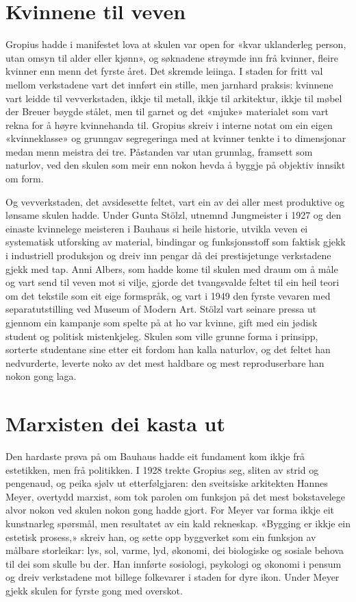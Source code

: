 \section{Kvinnene til veven}

Gropius hadde i manifestet lova at skulen var open for «kvar uklanderleg person, utan omsyn til alder eller kjønn», og søknadene strøymde inn frå kvinner, fleire kvinner enn menn det fyrste året. Det skremde leiinga. I staden for fritt val mellom verkstadene vart det innført ein stille, men jarnhard praksis: kvinnene vart leidde til vevverkstaden, ikkje til metall, ikkje til arkitektur, ikkje til møbel der Breuer bøygde stålet, men til garnet og det «mjuke» materialet som vart rekna for å høyre kvinnehanda til. Gropius skreiv i interne notat om ein eigen «kvinneklasse» og grunngav segregeringa med at kvinner tenkte i to dimensjonar medan menn meistra dei tre. Påstanden var utan grunnlag, framsett som naturlov, ved den skulen som meir enn nokon hevda å byggje på objektiv innsikt om form.

Og vevverkstaden, det avsidesette feltet, vart ein av dei aller mest produktive og lønsame skulen hadde. Under Gunta Stölzl, utnemnd Jungmeister i 1927 og den einaste kvinnelege meisteren i Bauhaus si heile historie, utvikla veven ei systematisk utforsking av material, bindingar og funksjonsstoff som faktisk gjekk i industriell produksjon og dreiv inn pengar då dei prestisjetunge verkstadene gjekk med tap. Anni Albers, som hadde kome til skulen med draum om å måle og vart send til veven mot si vilje, gjorde det tvangsvalde feltet til ein heil teori om det tekstile som eit eige formspråk, og vart i 1949 den fyrste vevaren med separatutstilling ved Museum of Modern Art. Stölzl vart seinare pressa ut gjennom ein kampanje som spelte på at ho var kvinne, gift med ein jødisk student og politisk mistenkjeleg. Skulen som ville grunne forma i prinsipp, sorterte studentane sine etter eit fordom han kalla naturlov, og det feltet han nedvurderte, leverte noko av det mest haldbare og mest reproduserbare han nokon gong laga.

\section{Marxisten dei kasta ut}

Den hardaste prøva på om Bauhaus hadde eit fundament kom ikkje frå estetikken, men frå politikken. I 1928 trekte Gropius seg, sliten av strid og pengenaud, og peika sjølv ut etterfølgjaren: den sveitsiske arkitekten Hannes Meyer, overtydd marxist, som tok parolen om funksjon på det mest bokstavelege alvor nokon ved skulen nokon gong hadde gjort. For Meyer var forma ikkje eit kunstnarleg spørsmål, men resultatet av ein kald rekneskap. «Bygging er ikkje ein estetisk prosess,» skreiv han, og sette opp byggverket som ein funksjon av målbare storleikar: lys, sol, varme, lyd, økonomi, dei biologiske og sosiale behova til dei som skulle bu der. Han innførte sosiologi, psykologi og økonomi i pensum og dreiv verkstadene mot billege folkevarer i staden for dyre ikon. Under Meyer gjekk skulen for fyrste gong med overskot.

